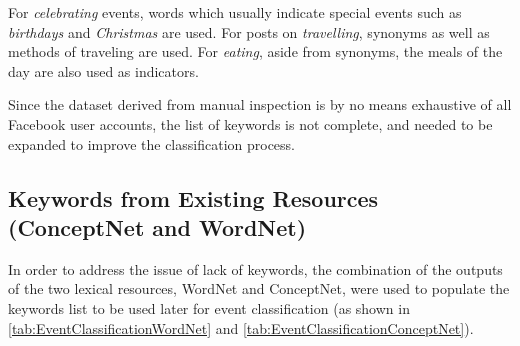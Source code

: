 For \textit{celebrating} events, words which usually indicate special events such as \textit{birthdays} and \textit{Christmas} are used. For posts on \textit{travelling}, synonyms as well as methods of traveling are used. For \textit{eating}, aside from synonyms, the meals of the day are also used as indicators.

Since the dataset derived from manual inspection is by no means exhaustive of all Facebook user accounts, the list of keywords is not complete, and needed to be expanded to improve the classification process. 

\subsection{Keywords from Existing Resources (ConceptNet and WordNet)}
In order to address the issue of lack of keywords, the combination of the outputs of the two lexical resources, WordNet and ConceptNet, were used to populate the keywords list to be used later for event classification (as shown in \ref{tab:EventClassificationWordNet} and \ref{tab:EventClassificationConceptNet}). 

